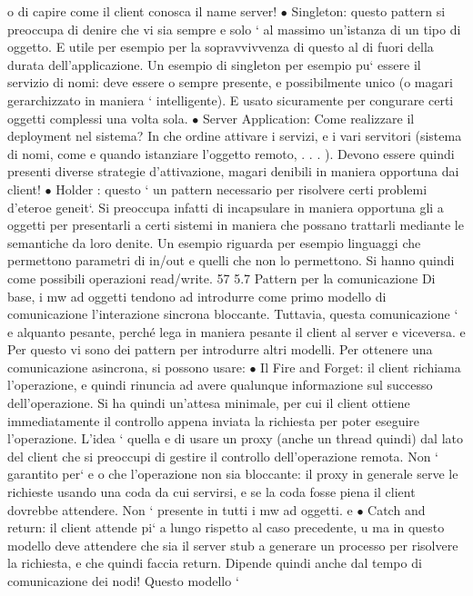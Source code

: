 \documentclass[a4paper,12pt]{article}
\begin{document}
o
di capire come il client conosca il name server!
$\bullet$ Singleton: questo pattern si preoccupa di denire che vi sia sempre e solo
`
al massimo un'istanza di un tipo di oggetto. E utile per esempio per
la sopravvivvenza di questo al di fuori della durata dell'applicazione. Un
esempio di singleton per esempio pu` essere il servizio di nomi: deve essere
o
sempre presente, e possibilmente unico (o magari gerarchizzato in maniera
`
intelligente). E usato sicuramente per congurare certi oggetti complessi
una volta sola.
$\bullet$ Server Application: Come realizzare il deployment nel sistema? In che
ordine attivare i servizi, e i vari servitori (sistema di nomi, come e quando
istanziare l'oggetto remoto, . . . ). Devono essere quindi presenti diverse
strategie d'attivazione, magari denibili in maniera opportuna dai client!
$\bullet$ Holder : questo ` un pattern necessario per risolvere certi problemi d'eteroe
geneit`. Si preoccupa infatti di incapsulare in maniera opportuna gli
a
oggetti per presentarli a certi sistemi in maniera che possano trattarli
mediante le semantiche da loro denite. Un esempio riguarda per esempio linguaggi che permettono parametri di in/out e
quelli che non lo
permettono. Si hanno quindi come possibili operazioni read/write.
57
5.7
Pattern per la comunicazione
Di base, i mw ad oggetti tendono ad introdurre come primo modello di comunicazione l'interazione sincrona bloccante.
Tuttavia, questa comunicazione `
e
alquanto pesante, perché lega in maniera pesante il client al server e viceversa.
e
Per questo vi sono dei pattern per introdurre altri modelli.
Per ottenere una comunicazione asincrona, si possono usare:
$\bullet$ Il Fire and Forget: il client richiama l'operazione, e quindi rinuncia ad
avere qualunque informazione sul successo dell'operazione. Si ha quindi
un'attesa minimale, per cui il client ottiene immediatamente il controllo
appena inviata la richiesta per poter eseguire l'operazione. L'idea ` quella
e
di usare un proxy (anche un thread quindi) dal lato del client che si preoccupi di gestire il controllo dell'operazione
remota. Non ` garantito per`
e
o
che l'operazione non sia bloccante: il proxy in generale serve le richieste
usando una coda da cui servirsi, e se la coda fosse piena il client dovrebbe
attendere. Non ` presente in tutti i mw ad oggetti.
e
$\bullet$ Catch and return: il client attende pi` a lungo rispetto al caso precedente,
u
ma in questo modello deve attendere che sia il server stub a generare un
processo per risolvere la richiesta, e che quindi faccia return. Dipende
quindi anche dal tempo di comunicazione dei nodi! Questo modello `
\end{document}
